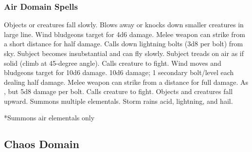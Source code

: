 \subsubsection{Air Domain Spells}
\begin{spelllist}
   Objects or creatures fall slowly.
   Blows away or knocks down smaller creatures in large line.
   Wind bludgeons target for 4d6 damage.
   Melee weapon can strike from a short distance for half damage.
   Calls down lightning bolts (3d8 per bolt) from sky.
   Subject becomes insubstantial and can fly slowly.
   Subject treads on air as if solid (climb at 45-degree angle).
   Calls creature to fight.
  \spellhead[5]{}
   Wind moves and bludgeons target for 10d6 damage.
   10d6 damage; 1 secondary bolt/level each dealing half damage.
   Melee weapon can strike from a distance for full damage.
   As , but 5d8 damage per bolt.
   Calls creature to fight.
   Objects and creatures fall upward.
   Summons multiple elementals.
   Storm rains acid, lightning, and hail.
\end{spelllist}
*Summons air elementals only

\subsection{Chaos Domain}


